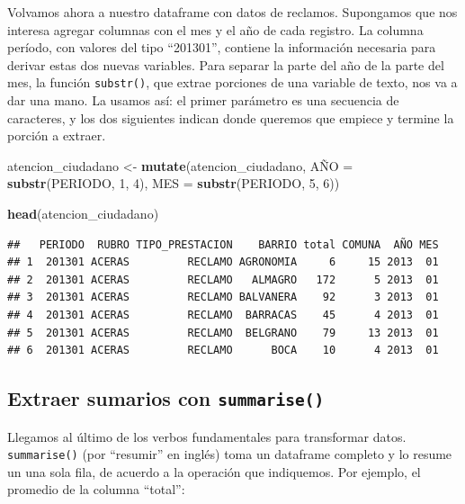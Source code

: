 \documentclass[]{book}
\newenvironment{Shaded}{\begin{snugshade}}{\end{snugshade}}
\newcommand{\KeywordTok}[1]{\textcolor[rgb]{0.13,0.29,0.53}{\textbf{#1}}}
\newcommand{\DataTypeTok}[1]{\textcolor[rgb]{0.13,0.29,0.53}{#1}}
\newcommand{\DecValTok}[1]{\textcolor[rgb]{0.00,0.00,0.81}{#1}}
\newcommand{\StringTok}[1]{\textcolor[rgb]{0.31,0.60,0.02}{#1}}
\newcommand{\NormalTok}[1]{#1}
\begin{document}
Volvamos ahora a nuestro dataframe con datos de reclamos. Supongamos que
nos interesa agregar columnas con el mes y el año de cada registro. La
columna período, con valores del tipo ``201301'', contiene la
información necesaria para derivar estas dos nuevas variables. Para
separar la parte del año de la parte del mes, la función
\texttt{substr()}, que extrae porciones de una variable de texto, nos va
a dar una mano. La usamos así: el primer parámetro es una secuencia de
caracteres, y los dos siguientes indican donde queremos que empiece y
termine la porción a extraer.

\begin{Shaded}
\begin{Highlighting}[]
\NormalTok{atencion_ciudadano <-}\StringTok{ }\KeywordTok{mutate}\NormalTok{(atencion_ciudadano,}
\NormalTok{                             AÑ}\DataTypeTok{O =} \KeywordTok{substr}\NormalTok{(PERIODO, }\DecValTok{1}\NormalTok{, }\DecValTok{4}\NormalTok{),}
                             \DataTypeTok{MES =} \KeywordTok{substr}\NormalTok{(PERIODO, }\DecValTok{5}\NormalTok{, }\DecValTok{6}\NormalTok{))}
                                
\KeywordTok{head}\NormalTok{(atencion_ciudadano) }
\end{Highlighting}
\end{Shaded}

\begin{verbatim}
##   PERIODO  RUBRO TIPO_PRESTACION    BARRIO total COMUNA  AÑO MES
## 1  201301 ACERAS         RECLAMO AGRONOMIA     6     15 2013  01
## 2  201301 ACERAS         RECLAMO   ALMAGRO   172      5 2013  01
## 3  201301 ACERAS         RECLAMO BALVANERA    92      3 2013  01
## 4  201301 ACERAS         RECLAMO  BARRACAS    45      4 2013  01
## 5  201301 ACERAS         RECLAMO  BELGRANO    79     13 2013  01
## 6  201301 ACERAS         RECLAMO      BOCA    10      4 2013  01
\end{verbatim}

\subsection{\texorpdfstring{Extraer sumarios con
\texttt{summarise()}}{Extraer sumarios con summarise()}}\label{extraer-sumarios-con-summarise}

Llegamos al último de los verbos fundamentales para transformar datos.
\texttt{summarise()} (por ``resumir'' en inglés) toma un dataframe
completo y lo resume un una sola fila, de acuerdo a la operación que
indiquemos. Por ejemplo, el promedio de la columna ``total'':
\end{document}
